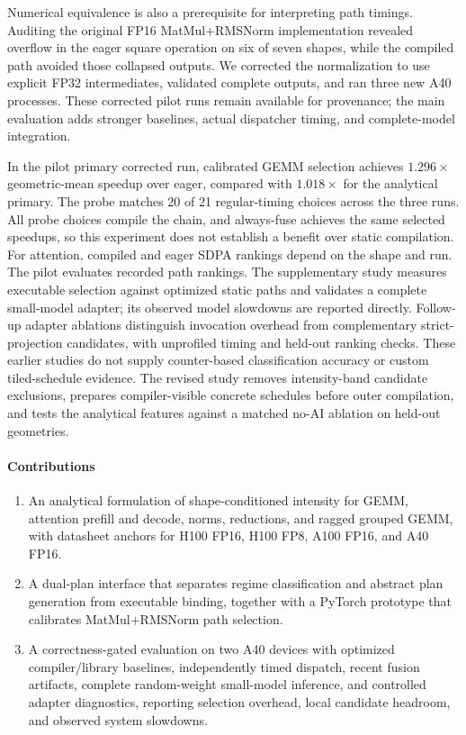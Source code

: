\documentclass[a4paper,fleqn]{cas-dc}
\begin{document}
Numerical equivalence is also a prerequisite for interpreting path timings.
Auditing the original FP16 MatMul+RMSNorm implementation revealed overflow in the eager square operation on six of seven shapes, while the compiled path avoided those collapsed outputs.
We corrected the normalization to use explicit FP32 intermediates, validated complete outputs, and ran three new A40 processes.
These corrected pilot runs remain available for provenance; the main evaluation adds stronger baselines, actual dispatcher timing, and complete-model integration.

In the pilot primary corrected run, calibrated GEMM selection achieves $1.296\times$ geometric-mean speedup over eager, compared with $1.018\times$ for the analytical primary.
The probe matches 20 of 21 regular-timing choices across the three runs.
All probe choices compile the chain, and always-fuse achieves the same selected speedups, so this experiment does not establish a benefit over static compilation.
For attention, compiled and eager SDPA rankings depend on the shape and run.
The pilot evaluates recorded path rankings. The supplementary study measures executable selection against optimized static paths and validates a complete small-model adapter; its observed model slowdowns are reported directly.
Follow-up adapter ablations distinguish invocation overhead from complementary strict-projection candidates, with unprofiled timing and held-out ranking checks.
These earlier studies do not supply counter-based classification accuracy or custom tiled-schedule evidence. The revised study removes intensity-band candidate exclusions, prepares compiler-visible concrete schedules before outer compilation, and tests the analytical features against a matched no-AI ablation on held-out geometries.

\paragraph{Contributions}
\begin{enumerate}
\item An analytical formulation of shape-conditioned intensity for GEMM, attention prefill and decode, norms, reductions, and ragged grouped GEMM, with datasheet anchors for H100 FP16, H100 FP8, A100 FP16, and A40 FP16.
\item A dual-plan interface that separates regime classification and abstract plan generation from executable binding, together with a PyTorch prototype that calibrates MatMul+RMSNorm path selection.
\item A correctness-gated evaluation on two A40 devices with optimized compiler/library baselines, independently timed dispatch, recent fusion artifacts, complete random-weight small-model inference, and controlled adapter diagnostics, reporting selection overhead, local candidate headroom, and observed system slowdowns.
\end{enumerate}
\end{document}
